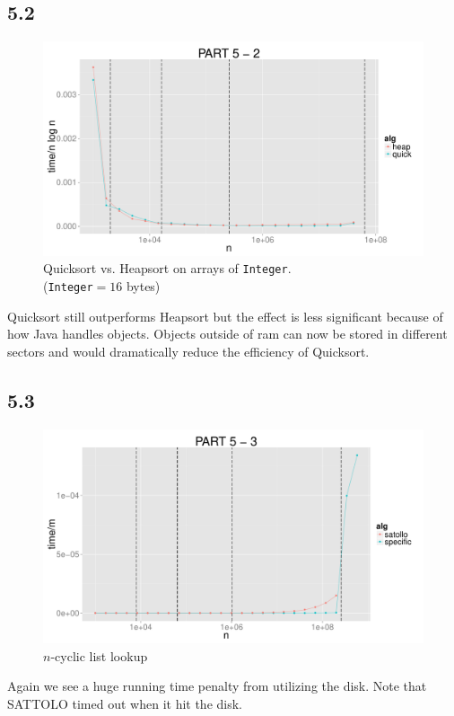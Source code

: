\documentclass{article}
\begin{document}
\subsection*{5.2}
\begin{figure}[H]
    \centering
    \includegraphics[width=
    \textwidth]{images/part5_2.pdf}
    \caption{Quicksort vs. Heapsort on arrays of \texttt{Integer}. 
    \\(\texttt{Integer}$= 16$ bytes)}
    \label{fig:awesome_image}
\end{figure}
Quicksort still outperforms Heapsort but the effect is less significant because 
of how Java handles objects. Objects outside of ram can now be stored in 
different sectors and would dramatically reduce the efficiency of Quicksort.  

\subsection*{5.3}
\begin{figure}[H]
    \centering
    \includegraphics[width=\textwidth]{images/part5_3.pdf}
    \caption{$n$-cyclic list lookup}
    \label{fig:awesome_image}
\end{figure}
Again we see a huge running time penalty from utilizing the disk. Note that 
SATTOLO timed out when it hit the disk. 
\newline
\end{document}
